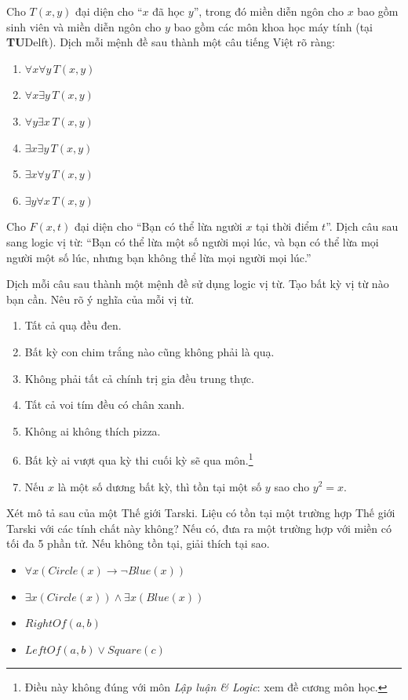 \begin{exercise}
Cho $T(x,y)$ đại diện cho ``$x$ đã học $y$'', trong đó miền diễn ngôn cho $x$ bao gồm sinh viên và miền diễn ngôn cho $y$ bao gồm các môn khoa học máy tính (tại \textbf{TU}Delft). Dịch mỗi mệnh đề sau thành một câu tiếng Việt rõ ràng:
\begin{enumerate}[label=\alph*)]
\item $\forall x \forall y\, T(x,y)$
\item $\forall x \exists y\, T(x,y)$
\item $\forall y \exists x\, T(x,y)$
\item $\exists x \exists y\, T(x,y)$
\item $\exists x \forall y\, T(x,y)$
\item $\exists y \forall x\, T(x,y)$
\end{enumerate}
\end{exercise}

\begin{exercise}
Cho $F(x,t)$ đại diện cho ``Bạn có thể lừa người $x$ tại thời điểm $t$''. Dịch câu sau sang logic vị từ: ``Bạn có thể lừa một số người mọi lúc, và bạn có thể lừa mọi người một số lúc, nhưng bạn không thể lừa mọi người mọi lúc.''
\end{exercise}

\begin{exercise}
Dịch mỗi câu sau thành một mệnh đề sử dụng logic vị từ. Tạo bất kỳ vị từ nào bạn cần. Nêu rõ ý nghĩa của mỗi vị từ.
\begin{enumerate}[label=\alph*)]
\item Tất cả quạ đều đen.
\item Bất kỳ con chim trắng nào cũng không phải là quạ.
\item Không phải tất cả chính trị gia đều trung thực.
\item Tất cả voi tím đều có chân xanh.
\item Không ai không thích pizza.
\item Bất kỳ ai vượt qua kỳ thi cuối kỳ sẽ qua môn.\footnote{Điều này không đúng với môn \textit{Lập luận \& Logic}: xem đề cương môn học.}
\item Nếu $x$ là một số dương bất kỳ, thì tồn tại một số $y$ sao cho $y^2 = x$.
\end{enumerate}
\end{exercise}

\begin{exercise}
Xét mô tả sau của một Thế giới Tarski. Liệu có tồn tại một trường hợp Thế giới Tarski với các tính chất này không? Nếu có, đưa ra một trường hợp với miền có tối đa 5 phần tử. Nếu không tồn tại, giải thích tại sao.
\begin{itemize}
\item $\forall x(Circle(x) \to \neg Blue(x))$
\item $\exists x(Circle(x)) \land \exists x(Blue(x))$
\item $RightOf(a,b)$
\item $LeftOf(a,b) \lor Square(c)$
\end{itemize}
\end{exercise}

